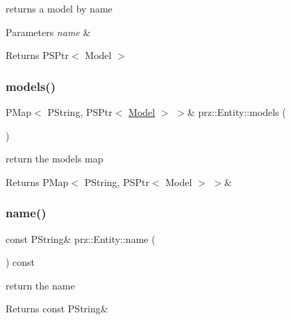 returns a model by name 


\begin{DoxyParams}{Parameters}
{\em name} & \\
\hline
\end{DoxyParams}
\begin{DoxyReturn}{Returns}
P\+S\+Ptr$<$ Model $>$ 
\end{DoxyReturn}
\mbox{\label{classprz_1_1_entity_af6c594463d2a6cb91d1e30b7d5bda397}} 
\subsubsection{\texorpdfstring{models()}{models()}}
{\footnotesize\ttfamily P\+Map$<$ P\+String, P\+S\+Ptr$<$ \mbox{\hyperlink{classprz_1_1_model}{Model}} $>$ $>$\& prz\+::\+Entity\+::models (\begin{DoxyParamCaption}{ }\end{DoxyParamCaption})\hspace{0.3cm}{\ttfamily [inline]}}



return the models map 

\begin{DoxyReturn}{Returns}
P\+Map$<$ P\+String, P\+S\+Ptr$<$ Model $>$ $>$\& 
\end{DoxyReturn}
\mbox{\label{classprz_1_1_entity_a3dcb8ce07126711bf90f3272b293d980}} 
\subsubsection{\texorpdfstring{name()}{name()}}
{\footnotesize\ttfamily const P\+String\& prz\+::\+Entity\+::name (\begin{DoxyParamCaption}{ }\end{DoxyParamCaption}) const\hspace{0.3cm}{\ttfamily [inline]}}



return the name 

\begin{DoxyReturn}{Returns}
const P\+String\& 
\end{DoxyReturn}
\mbox{\label{classprz_1_1_entity_a3ad5dd16209c48164624522f99a2d418}} 
